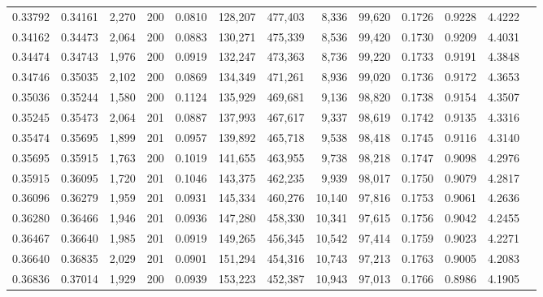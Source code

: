 \begin{tabular}{rrrrrrrrrrrrr}
0.33792 & 0.34161 & 2,270 & 200 &                                     0.0810 & 128,207 & 477,403 &   8,336 &  99,620 & 0.1726 & 0.9228 & 4.4222 \\
0.34162 & 0.34473 & 2,064 & 200 &                                     0.0883 & 130,271 & 475,339 &   8,536 &  99,420 & 0.1730 & 0.9209 & 4.4031 \\
0.34474 & 0.34743 & 1,976 & 200 &                                     0.0919 & 132,247 & 473,363 &   8,736 &  99,220 & 0.1733 & 0.9191 & 4.3848 \\
0.34746 & 0.35035 & 2,102 & 200 &                                     0.0869 & 134,349 & 471,261 &   8,936 &  99,020 & 0.1736 & 0.9172 & 4.3653 \\
0.35036 & 0.35244 & 1,580 & 200 &                                     0.1124 & 135,929 & 469,681 &   9,136 &  98,820 & 0.1738 & 0.9154 & 4.3507 \\
0.35245 & 0.35473 & 2,064 & 201 &                                     0.0887 & 137,993 & 467,617 &   9,337 &  98,619 & 0.1742 & 0.9135 & 4.3316 \\
0.35474 & 0.35695 & 1,899 & 201 &                                     0.0957 & 139,892 & 465,718 &   9,538 &  98,418 & 0.1745 & 0.9116 & 4.3140 \\
0.35695 & 0.35915 & 1,763 & 200 &                                     0.1019 & 141,655 & 463,955 &   9,738 &  98,218 & 0.1747 & 0.9098 & 4.2976 \\
0.35915 & 0.36095 & 1,720 & 201 &                                     0.1046 & 143,375 & 462,235 &   9,939 &  98,017 & 0.1750 & 0.9079 & 4.2817 \\
0.36096 & 0.36279 & 1,959 & 201 &                                     0.0931 & 145,334 & 460,276 &  10,140 &  97,816 & 0.1753 & 0.9061 & 4.2636 \\
0.36280 & 0.36466 & 1,946 & 201 &                                     0.0936 & 147,280 & 458,330 &  10,341 &  97,615 & 0.1756 & 0.9042 & 4.2455 \\
0.36467 & 0.36640 & 1,985 & 201 &                                     0.0919 & 149,265 & 456,345 &  10,542 &  97,414 & 0.1759 & 0.9023 & 4.2271 \\
0.36640 & 0.36835 & 2,029 & 201 &                                     0.0901 & 151,294 & 454,316 &  10,743 &  97,213 & 0.1763 & 0.9005 & 4.2083 \\
0.36836 & 0.37014 & 1,929 & 200 &                                     0.0939 & 153,223 & 452,387 &  10,943 &  97,013 & 0.1766 & 0.8986 & 4.1905 \\

\end{tabular}
